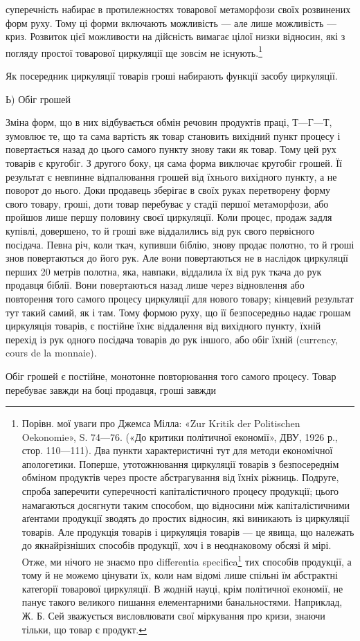 \parcont{}  %
суперечність набирає в протилежностях товарової метаморфози
своїх розвинених форм руху. Тому ці форми включають можливість
— але лише можливість — криз. Розвиток цієї можливости
на дійсність вимагає цілої низки відносин, які з погляду простої
товарової циркуляції ще зовсім не існують.\footnote{
Порівн. мої уваги про Джемса Мілла: «Zur Kritik der Politischen
Oekonomie», S. 74—76. («До критики політичної економії», ДВУ, 1926 р.,
стор. 110—111). Два пункти характеристичні тут для методи економічної
апологетики. Поперше, утотожнювання циркуляції товарів з безпосереднім
обміном продуктів через просте абстрагування від їхніх ріжниць.
Подруге, спроба заперечити суперечності капіталістичного процесу продукції;
цього намагаються досягнути таким способом, що відносини між
капіталістичними аґентами продукції зводять до простих відносин, які
виникають із циркуляції товарів. Але продукція товарів і циркуляція
товарів — це явища, що належать до якнайрізніших способів продукції,
хоч і в неоднаковому обсязі й мірі. Отже, ми нічого не знаємо про differentia
specifica\footnote*{
— характеристичні особливості. \emph{Ред.}
} тих способів продукції, а тому й не можемо цінувати їх,
коли нам відомі лише спільні їм абстрактні категорії товарової циркуляції.
В жодній науці, крім політичної економії, не панує такого великого
пишання елементарними банальностями. Наприклад, Ж. Б. Сей зважується
висловлювати свої міркування про кризи, знаючи тільки, що товар
є продукт.
}

Як посередник циркуляції товарів гроші набирають функції
засобу циркуляції.

Ь) Обіг грошей

Зміна форм, що в них відбувається обмін речовин продуктів
праці, $Т — Г — Т$, зумовлює те, що та сама вартість як товар
становить вихідний пункт процесу і повертається назад до цього
самого пункту знову таки як товар. Тому цей рух товарів є кругобіг.
З другого боку, ця сама форма виключає кругобіг грошей.
Її результат є невпинне відпалювання грошей від їхнього вихідного
пункту, а не поворот до нього. Доки продавець зберігає
в своїх руках перетворену форму свого товару, гроші, доти
товар перебуває у стадії першої метаморфози, або пройшов лише
першу половину своєї циркуляції. Коли процес, продаж задля
купівлі, довершено, то й гроші вже віддалились від рук свого
первісного посідача. Певна річ, коли ткач, купивши біблію,
знову продає полотно, то й гроші знов повертаються до його рук.
Але вони повертаються не в наслідок циркуляції перших
20 метрів полотна, яка, навпаки, віддалила їх від рук ткача
до рук продавця біблії. Вони повертаються назад лише через
відновлення або повторення того самого процесу циркуляції
для нового товару; кінцевий результат тут такий самий, як
і там. Тому формою руху, що її безпосередньо надає грошам
циркуляція товарів, є постійне їхнє віддалення від вихідного
пункту, їхній перехід із рук одного посідача товарів до рук
іншого, або обіг їхній (currency, cours de la monnaie).

Обіг грошей є постійне, монотонне повторювання того самого
процесу. Товар перебуває завжди на боці продавця, гроші завжди
\parbreak{}  %
